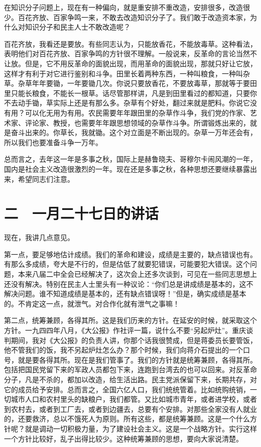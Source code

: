 在知识分子问题上，现在有一种偏向，就是重安排不重改造，安排很多，改造很少。百花齐放、百家争鸣一来，不敢去改造知识分子了。我们敢于改造资本家，为什么对知识分子和民主人士不敢改造呢？

百花齐放，我看还是要放。有些同志认为，只能放香花，不能放毒草。这种看法，表明他们对百花齐放、百家争鸣的方针很不理解。一般说来，反革命的言论当然不让放。但是，它不用反革命的面貌出现，而用革命的面貌出现，那就只好让它放，这样才有利于对它进行鉴别和斗争。田里长着两种东西，一种叫粮食，一种叫杂草。杂草年年要锄，一年要锄几次。你说只要放香花，不要放毒草，那就等于要田里只能长粮食，不能长一根草。话尽管那样讲，凡是到田里看过的都知道，只要你不去动手锄，草实际上还是有那么多。杂草有个好处，翻过来就是肥料。你说它没有用？可以化无用为有用。农民需要年年跟田里的杂草作斗争，我们党的作家、艺术家、评论家、教授，也需要年年跟思想领域的杂草作斗争。所谓锻炼出来的，就是奋斗出来的。你草长，我就锄。这个对立面是不断出现的。杂草一万年还会有，所以我们也要准备斗争一万年。

总而言之，去年这一年是多事之秋，国际上是赫鲁晓夫、哥穆尔卡闹风潮的一年，国内是社会主义改造很激烈的一年。现在还是多事之秋，各种思想还要继续暴露出来，希望同志们注意。

\section{二　一月二十七日的讲话}

现在，我讲几点意见。

第一点，要足够地估计成绩。我们的革命和建设，成绩是主要的，缺点错误也有。有那么多成绩，夸大是不行的，但是估低了就要犯错误，可能要犯大错误。这个问题，本来八届二中全会已经解决了，这次会上还多次谈到，可见在一些同志思想上还没有解决。特别在民主人士里头有一种议论：“你们总是讲成绩是基本的，这不解决问题。谁不知道成绩是基本的，还有缺点错误呀！”但是，确实成绩是基本的。不肯定这一点，就泄气。对合作化就有泄气之事嘛！

第二点，统筹兼顾，各得其所。这是我们历来的方针。在延安的时候，就采取这个方针。一九四四年八月，《大公报》作社评一篇，说什么不要“另起炉灶”。重庆谈判期间，我对《大公报》的负责人讲，你那个话我很赞成，但是蒋委员长要管饭，他不管我们的饭，我不另起炉灶怎么办？那个时候，我们向蒋介石提出的一个口号，就是要各得其所。现在是我们管事了。我们的方针就是统筹兼顾，各得其所。包括把国民党留下来的军政人员都包下来，连跑到台湾去的也可以回来。对反革命分子，凡是不杀的，都加以改造，给生活出路。民主党派保留下来，长期共存，对它的成员给予安排。总而言之，全国六亿人口，我们统统管着。比如统购统销，一切城市人口和农村里头的缺粮户，我们都管。又比如城市青年，或者进学校，或者到农村去，或者到工厂去，或者到边疆去，总要有个安排。对那些全家没有人就业的，还要救济，总以不饿死人为原则。所有这些，都是统筹兼顾。这是一个什么方针呢？就是调动一切积极力量，为了建设社会主义。这是一个战略方针。实行这样一个方针比较好，乱子出得比较少。这种统筹兼顾的思想，要向大家说清楚。

